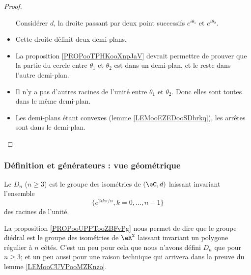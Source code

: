 \begin{proof}
\begin{subproof}
\begin{itemize}
                    Considérer \( d\),  la droite passant par deux point successifs \(  e^{i\theta_1}\) et \(  e^{i\theta_2}\).
                \item
                    Cette droite définit deux demi-plans.
                \item
                    La proposition \ref{PROPooTPHKooXnpJaV} devrait permettre de prouver que la partie du cercle entre \( \theta_1\) et \( \theta_2\) est dans un demi-plan, et le reste dans l'autre demi-plan.
                \item
                    Il n'y a pas d'autres racines de l'unité entre \( \theta_1\) et \( \theta_2\). Donc elles sont toutes dans le même demi-plan.
                \item
                    Les demi-plans étant convexes (lemme \ref{LEMooEZEDooSDbrkq}), les arrêtes sont dans le demi-plan.
            \end{itemize}
    \end{subproof}
\end{proof}


\subsubsection{Définition et générateurs : vue géométrique}

\begin{definition}  \label{DEFooIWZGooAinSOh}
	Le  \( D_n\) (\( n\geq 3\)) est le groupe des isométries de \( (\eC,d)\) laissant invariant l'ensemble
	\begin{equation}
		\{  e^{2ik\pi/n},k=0,\ldots, n-1 \}
	\end{equation}
	des racines de l'unité.
\end{definition}

\begin{normaltext}
	La proposition \ref{PROPooUPPTooZBFvPg} nous permet de dire que le groupe diédral est le groupe des isométries de \( \eR^2\) laissant invariant un polygone régulier à \( n\) côtés.
	C'est un peu pour cela que nous n'avons défini \( D_n\) que pour \( n\geq 3\); et un peu aussi pour une raison technique qui arrivera dans la preuve du lemme \ref{LEMooCUVPooMZKnzo}.
\end{normaltext}

